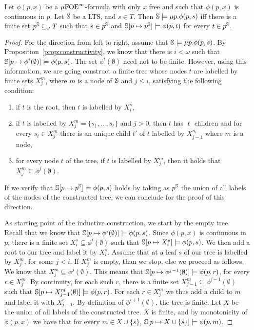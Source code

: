 \begin{proposition}\label{prop:cor_constructivity}
Let $\phi(p,x)$ be a $\mu{\ensuremath{\mathrm{FOE}}}^\infty$-formula with only $x$ free and such that $\phi(p,x)$ is continuous in $p$. Let $\mathbb{S}$ be a LTS, and $s \in T$. Then
$\mathbb{S} \models \mu p. \phi(p,s)$ iff there is a finite set $p^{\mathbb{S}} \subseteq_\omega T$ such that $s\in p^{\mathbb{S}}$ and $\mathbb{S}[p\mapsto p^{\mathbb{S}}] \models \phi(p,t)$  for every $t \in p^{\mathbb{S}}$.
\end{proposition}
 \begin{proof}
 For the direction from left to right, assume that $\mathbb{S} \models \mu p. \phi(p,s)$. By Proposition~\ref{prop:constructivity}, we know that  there is $i< \omega$ such that $\mathbb{S}[p \mapsto \phi^i(\emptyset)] \models \phi(p, s)$. The set $\phi^i(\emptyset)$ need not to be finite. However,
 using this information, we are going construct a finite tree whose nodes $t$ are labelled by finite sets $X^m_j$, where $m$ is a node of $\mathbb{S}$ and $j \leq i$, satisfying the following condition:
 \begin{enumerate}
\item  if $t$ is the root, then $t$ is labelled by $X_i^s$,
\item  if $t$ is labelled by $X_j^m=\{s_1, \dots, s_\ell\}$ and $j>0$, then $t$ has $\ell$  children and for every $s_i \in X_j^m$ there is an unique child $t'$ of $t$ labelled by $X_{j-1}^{n_i}$ where $m$ is a node,
\item for every node $t$ of the tree, if $t$ is labelled by $X_j^m$, then it holds that $X_j^m \subseteq \phi^{j}(\emptyset)$.
\end{enumerate}
If we verify that $\mathbb{S}[p\mapsto p^{\mathbb{S}}] \models \phi(p,s)$ holds by taking as $p^{\mathbb{S}}$ the union of all labels of the nodes of the constructed tree, we can conclude for the proof of this direction.

As starting point of the inductive construction, we start by the empty tree.  Recall that we know that  $\mathbb{S}[p \mapsto \phi^i(\emptyset)] \models \phi(p, s)$. Since $\phi(p,x)$ is continuous in $p$, there is a finite set $X^s_i \subseteq \phi^i(\emptyset)$ such that $\mathbb{S}[p \mapsto X^s_i] \models \phi(p, s)$. We then add a root to our tree and label it by $X^s_i$.
 Assume that at a leaf $s$ of our tree is labelled by $X^m_j$, for some $j < i$. If $X^m_j$ is empty, than we stop, else we proceed as follows. We know that $X^m_j\subseteq \phi^{j}(\emptyset)$. This means that $\mathbb{S}[p \mapsto \phi^{j-1}(\emptyset)] \models \phi(p, r)$, for every $r \in X_j^m$. By continuity, for each such $r$, there is a finite set $X^m_{j-1} \subseteq  \phi^{j-1}(\emptyset)$ such that $\mathbb{S}[p \mapsto X^m_{j-1}(\emptyset)] \models \phi(p, r)$. For each $r \in X^m_j$ we thus add a child to $m$ and label it with $X^r_{j-1}$. By definition of $\phi^{i+1}(\emptyset)$, the tree is finite. Let $X$ be the union of all labels of the constructed tree. $X$ is finite, and by monotonicity of $\phi(p,x)$ we have that for every $m \in X \cup \{s\}$, $\mathbb{S}[p \mapsto X \cup \{s\}] \models \phi(p,m)$.


\end{proof}
